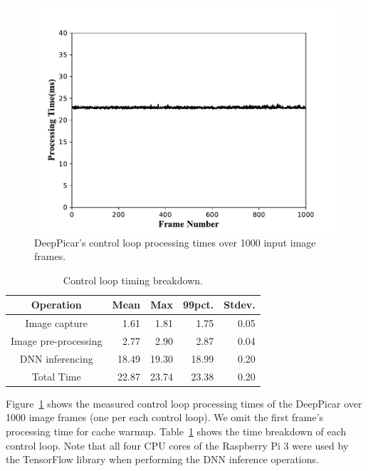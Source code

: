 
\begin{figure}[t]
  \centering
  \includegraphics[width=.75\textwidth]{figs/Fig7_new}
  \caption{DeepPicar's control loop processing times over 1000 input image frames.}
  \label{fig:control-loop-timing}
\end{figure}

\begin{table}[t]
  \centering
  \begin{tabular} {| c | r | r | r | r |}
    \hline
    \textbf{Operation} & \textbf{Mean} & \textbf{Max} &   \textbf{99pct.} & \textbf{Stdev.} \\ \hline
    Image capture        & 1.61  &  1.81 &  1.75  & 0.05 \\ \hline
    Image pre-processing & 2.77  &  2.90 &  2.87  & 0.04 \\ \hline
    DNN inferencing      & 18.49 & 19.30 & 18.99  & 0.20 \\ \hline
    Total Time           & 22.87 & 23.74 & 23.38  & 0.20 \\ \hline
  \end{tabular}
  \caption{Control loop timing breakdown.}
  \label{tbl:control-loop-breakdown}
\end{table}

Figure~\ref{fig:control-loop-timing} shows the measured control loop 
processing times of the DeepPicar over 1000 image frames (one per each
control loop). We omit the first frame's processing time for cache
warmup. Table~\ref{tbl:control-loop-breakdown} shows the time
breakdown of each control loop. Note that all four CPU cores of the
Raspberry Pi 3 were used by the TensorFlow library when performing the
DNN inference operations.

